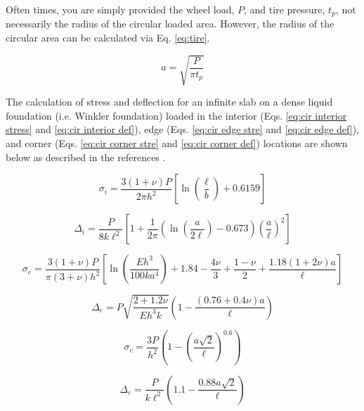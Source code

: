 \documentclass[notitlepage,letterpaper,fleqn]{report}
\begin{document}
Often times, you are simply provided the wheel load, $P$, and tire pressure, $t_p$, not necessarily the radius of the circular loaded area. However, the radius of the circular area can be calculated via Eq. \ref{eq:tire}.

\begin{equation}
a = \sqrt{\dfrac{P}{\pi t_p}}
\label{eq:tire}
\end{equation}

The calculation of stress and deflection for an infinite slab on a dense liquid foundation (i.e. Winkler foundation) loaded in the interior (Eqs. \ref{eq:cir interior stress} and \ref{eq:cir interior def}), edge (Eqs. \ref{eq:cir edge stre} and \ref{eq:cir edge def}), and corner (Eqs. \ref{eq:cir corner stre} and \ref{eq:cir corner def}) locations are shown below as described in the references \cite{HM1926,HM1939,HM1948,Ioannides1986}.

\begin{equation}
\sigma_{i}=\dfrac{3\left(1+\nu\right)P}{2\pi h^{2}}\left[\ln\left(\dfrac{\ell}{b}\right)+0.6159\right]
\label{eq:cir interior stress}
\end{equation}

\begin{equation}
\Delta_{i}=\dfrac{P}{8k\ell^{2}}\left[1+\dfrac{1}{2\pi}\left(\ln\left(\dfrac{a}{2\ell}\right)-0.673\right)\left(\dfrac{a}{\ell}\right)^{2}\right]
\label{eq:cir interior def}
\end{equation}

\begin{equation}
\sigma_{e}=\dfrac{3\left(1+\nu\right)P}{\pi\left(3+\nu\right)h^{2}}\left[\ln\left(\dfrac{Eh^{3}}{100ka^{4}}\right)+1.84-\dfrac{4\nu}{3}+\dfrac{1-\nu}{2}+\dfrac{1.18\left(1+2\nu\right)a}{\ell}\right]
\label{eq:cir edge stre}
\end{equation}

\begin{equation}
\Delta_{e}=P\sqrt{\dfrac{2+1.2\nu}{Eh^{3}k}}\left(1-\dfrac{\left(0.76+0.4\nu\right)a}{\ell}\right)
\label{eq:cir edge def}
\end{equation}

\begin{equation}
\sigma_{c}=\dfrac{3P}{h^{2}}\left(1-\left(\dfrac{a\sqrt{2}}{\ell}\right)^{0.6}\right)
\label{eq:cir corner stre}
\end{equation}

\begin{equation}
\Delta_{c}=\dfrac{P}{k\ell^{2}}\left(1.1-\dfrac{0.88a\sqrt{2}}{\ell}\right)
\label{eq:cir corner def}
\end{equation}
\end{document}
